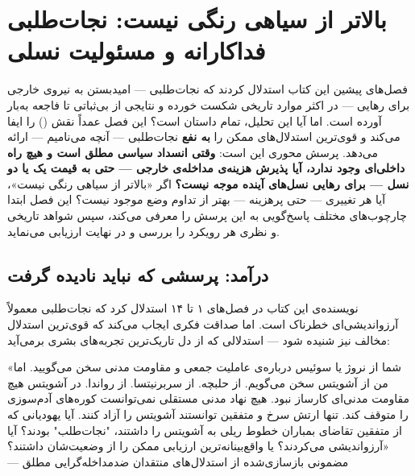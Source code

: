\chapter{بالاتر از سیاهی رنگی نیست: نجات‌طلبی فداکارانه و مسئولیت نسلی}
\label{ch:sacrificial-liberation}

\begin{tcolorbox}[mybox, title={چکیده‌ی فصل}]
فصل‌های پیشین این کتاب استدلال کردند که نجات‌طلبی — امیدبستن به نیروی خارجی برای رهایی — در اکثر موارد تاریخی شکست خورده و نتایجی از بی‌ثباتی تا فاجعه به‌بار آورده است. اما آیا این تحلیل، تمام داستان است؟ این فصل عمداً نقش  () را ایفا می‌کند و قوی‌ترین استدلال‌های ممکن را \textbf{به نفع} نجات‌طلبی — آنچه  می‌نامیم — ارائه می‌دهد. پرسش محوری این است: \textbf{وقتی انسداد سیاسی مطلق است و هیچ راه داخلی‌ای وجود ندارد، آیا پذیرش هزینه‌ی مداخله‌ی خارجی — حتی به قیمت یک یا دو نسل — برای رهایی نسل‌های آینده موجه نیست؟} اگر «بالاتر از سیاهی رنگی نیست»، آیا هر تغییری — حتی پرهزینه — بهتر از تداوم وضع موجود نیست؟ این فصل ابتدا چارچوب‌های مختلف پاسخ‌گویی به این پرسش را معرفی می‌کند، سپس شواهد تاریخی و نظری هر رویکرد را بررسی و در نهایت ارزیابی می‌نماید.
\end{tcolorbox}

\section{درآمد: پرسشی که نباید نادیده گرفت}
\label{sec:ch15-intro}

نویسنده‌ی این کتاب در فصل‌های ۱ تا ۱۴ استدلال کرد که نجات‌طلبی معمولاً آرزواندیشی‌ای خطرناک است. اما صداقت فکری ایجاب می‌کند که قوی‌ترین استدلال مخالف نیز شنیده شود — استدلالی که از دل تاریک‌ترین تجربه‌های بشری برمی‌آید:

\begin{tcolorbox}[quotebox, title={صدای دیگر}]
«شما از نروژ یا سوئیس درباره‌ی عاملیت جمعی و مقاومت مدنی سخن می‌گویید. اما من از آشویتس سخن می‌گویم. از حلبچه. از سربرنیتسا. از رواندا. در آشویتس هیچ مقاومت مدنی‌ای کارساز نبود. هیچ نهاد مدنی مستقلی نمی‌توانست کوره‌های آدم‌سوزی را متوقف کند. تنها ارتش سرخ و متفقین توانستند آشویتس را آزاد کنند. آیا یهودیانی که از متفقین تقاضای بمباران خطوط ریلی به آشویتس را داشتند، "نجات‌طلب" بودند؟ آیا آرزواندیشی می‌کردند؟ یا واقع‌بینانه‌ترین ارزیابی ممکن را از وضعیت‌شان داشتند؟»\\
— مضمونی بازسازی‌شده از استدلال‌های منتقدان ضدمداخله‌گرایی مطلق
\end{tcolorbox}


